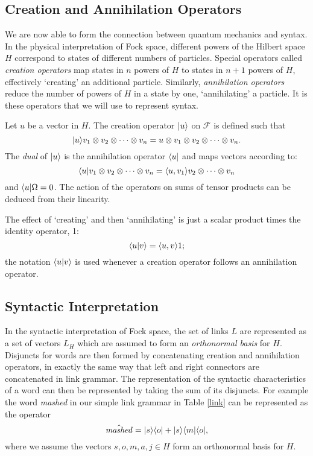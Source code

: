 \documentclass[12pt]{report}
\begin{document}




\subsection{Creation and Annihilation Operators}

We are now able to form the connection between quantum mechanics and syntax.
In the physical interpretation of Fock space, different powers of the Hilbert space $H$ correspond to states of different numbers of particles. Special operators called \emph{creation operators} map states in $n$ powers of $H$ to states in $n+1$ powers of $H$, effectively `creating' an additional particle. Similarly, \emph{annihilation operators} reduce the number of powers of $H$ in a state by one, `annihilating' a particle. It is these operators that we will use to represent syntax.

Let $u$ be a vector in $H$. The creation operator $|u \rangle$ on $\mathcal{F}$ is defined such that
$$|u \rangle v_1\otimes v_2 \otimes \cdots \otimes v_n = u \otimes v_1\otimes v_2 \otimes \cdots \otimes v_n.$$
The \emph{dual} of $|u \rangle$ is the annihilation operator $\langle u|$ and maps vectors according to:
$$\langle u|v_1\otimes v_2 \otimes \cdots \otimes v_n = \langle u, v_1 \rangle v_2 \otimes \cdots \otimes v_n$$
and $\langle u|\Omega = 0$. The action of the operators on sums of tensor products can be deduced from their linearity.

The effect of `creating' and then `annihilating' is just a scalar product times the identity operator, 1:
$$\langle u| v\rangle = \langle u, v \rangle1;$$
the notation $\langle u| v\rangle$ is used whenever a creation operator follows an annihilation operator.

\subsection{Syntactic Interpretation}

In the syntactic interpretation of Fock space, the set of links $L$ are represented as a set of vectors $L_H$ which are assumed to form an \emph{orthonormal basis} for $H$. Disjuncts for words are then formed by concatenating creation and annihilation operators, in exactly the same way that left and right connectors are concatenated in link grammar. The representation of the syntactic characteristics of a word can then be represented by taking the sum of its disjuncts. For example the word \emph{mashed} in our simple link grammar in Table \ref{link} can be represented as the operator
$$\hat{\mathit{mashed}} = |s \rangle\langle o| + |s \rangle\langle m|\langle o|,$$
where we assume the vectors $s,o,m,a,j \in H$ form an orthonormal basis for $H$.
\end{document}
